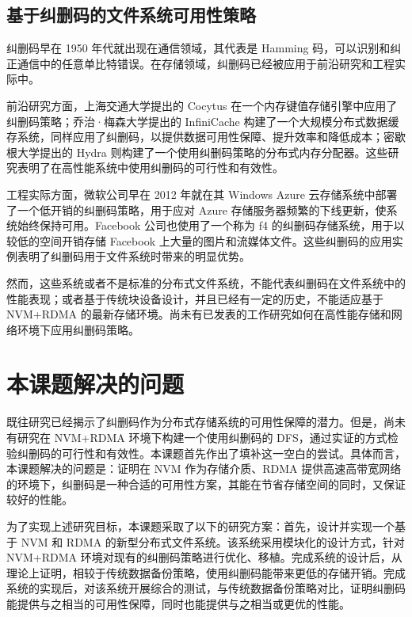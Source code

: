 \subsection{基于纠删码的文件系统可用性策略}
\label{subsec:ch1_ec_relworks}

纠删码早在 1950 年代就出现在通信领域，其代表是 Hamming 码，可以识别和纠正通信中的任意单比特错误。在存储领域，纠删码已经被应用于前沿研究和工程实际中。

前沿研究方面，上海交通大学提出的 Cocytus\cite{cocytus2016} 在一个内存键值存储引擎中应用了纠删码策略；乔治·梅森大学提出的 InfiniCache\cite{infinicache2020} 构建了一个大规模分布式数据缓存系统，同样应用了纠删码，以提供数据可用性保障、提升效率和降低成本；密歇根大学提出的 Hydra\cite{hydra2019} 则构建了一个使用纠删码策略的分布式内存分配器。这些研究表明了在高性能系统中使用纠删码的可行性和有效性。

工程实际方面，微软公司早在 2012 年就在其 Windows Azure 云存储系统中部署了一个低开销的纠删码策略\cite{azure2012}，用于应对 Azure 存储服务器频繁的下线更新，使系统始终保持可用。Facebook 公司也使用了一个称为 f4 的纠删码存储系统\cite{facebook2014}，用于以较低的空间开销存储 Facebook 上大量的图片和流媒体文件。这些纠删码的应用实例表明了纠删码用于文件系统时带来的明显优势。

然而，这些系统或者不是标准的分布式文件系统，不能代表纠删码在文件系统中的性能表现；或者基于传统块设备设计，并且已经有一定的历史，不能适应基于 NVM+RDMA 的最新存储环境。尚未有已发表的工作研究如何在高性能存储和网络环境下应用纠删码策略。

\section{本课题解决的问题}
\label{sec:ch1_thiswork}

既往研究已经揭示了纠删码作为分布式存储系统的可用性保障的潜力。但是，尚未有研究在 NVM+RDMA 环境下构建一个使用纠删码的 DFS，通过实证的方式检验纠删码的可行性和有效性。本课题首先作出了填补这一空白的尝试。具体而言，本课题解决的问题是：证明在 NVM 作为存储介质、RDMA 提供高速高带宽网络的环境下，纠删码是一种合适的可用性方案，其能在节省存储空间的同时，又保证较好的性能。

为了实现上述研究目标，本课题采取了以下的研究方案：首先，设计并实现一个基于 NVM 和 RDMA 的新型分布式文件系统。该系统采用模块化的设计方式，针对 NVM+RDMA 环境对现有的纠删码策略进行优化、移植。完成系统的设计后，从理论上证明，相较于传统数据备份策略，使用纠删码能带来更低的存储开销。完成系统的实现后，对该系统开展综合的测试，与传统数据备份策略对比，证明纠删码能提供与之相当的可用性保障，同时也能提供与之相当或更优的性能。
